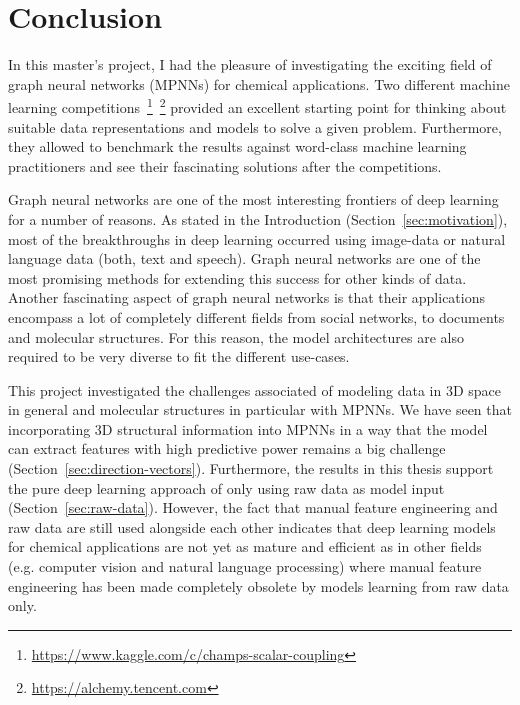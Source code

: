 \chapter{Conclusion}
\label{chapter:Conclusion}

In this master's project, I had the pleasure of investigating the exciting field of graph neural networks (MPNNs) for chemical applications. Two different machine learning competitions~\footnote{\url{https://www.kaggle.com/c/champs-scalar-coupling}}~\footnote{\url{https://alchemy.tencent.com}} provided an excellent starting point for thinking about suitable data representations and models to solve a given problem. Furthermore, they allowed to benchmark the results against word-class machine learning practitioners and see their fascinating solutions after the competitions.

Graph neural networks are one of the most interesting frontiers of deep learning for a number of reasons. As stated in the Introduction (Section~\ref{sec:motivation}), most of the breakthroughs in deep learning occurred using image-data or natural language data (both, text and speech). Graph neural networks are one of the most promising methods for extending this success for other kinds of data. Another fascinating aspect of graph neural networks is that their applications encompass a lot of completely different fields from social networks, to documents and molecular structures. For this reason, the model architectures are also required to be very diverse to fit the different use-cases.

This project investigated the challenges associated of modeling data in 3D space in general and molecular structures in particular with MPNNs. We have seen that incorporating 3D structural information into MPNNs in a way that the model can extract features with high predictive power remains a big challenge (Section~\ref{sec:direction-vectors}). Furthermore, the results in this thesis support the pure deep learning approach of only using raw data as model input (Section~\ref{sec:raw-data}). However, the fact that manual feature engineering and raw data are still used alongside each other indicates that deep learning models for chemical applications are not yet as mature and efficient as in other fields (e.g. computer vision and natural language processing) where manual feature engineering has been made completely obsolete by models learning from raw data only.

